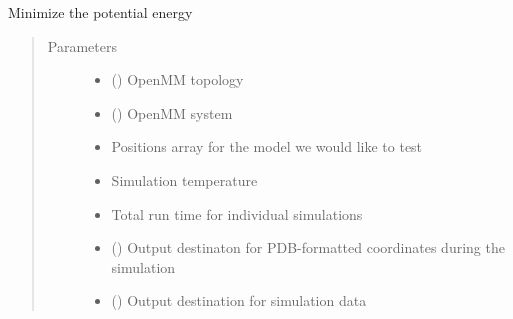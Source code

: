 \documentclass[letterpaper,12pt,english,openany,oneside]{sphinxmanual}
\begin{document}
\begin{fulllineitems}
\label{\detokenize{simulation:simulation.tools.minimize_structure}}
Minimize the potential energy
\begin{quote}\begin{description}
\item[{Parameters}] \leavevmode\begin{itemize}
\item {} 
 (\sphinxstyleliteralemphasis{\sphinxupquote{(}}\sphinxstyleliteralemphasis{\sphinxupquote{)}}) \textendash{} OpenMM topology

\item {} 
 (\sphinxstyleliteralemphasis{\sphinxupquote{(}}\sphinxstyleliteralemphasis{\sphinxupquote{)}}) \textendash{} OpenMM system

\item {} 
 \textendash{} Positions array for the model we would like to test

\item {} 
 \textendash{} Simulation temperature

\item {} 
 \textendash{} Total run time for individual simulations

\item {} 
 () \textendash{} Output destinaton for PDB-formatted coordinates during the simulation

\item {} 
 () \textendash{} Output destination for simulation data


\end{itemize}
\end{description}
\end{quote}
\end{fulllineitems}
\end{document}
